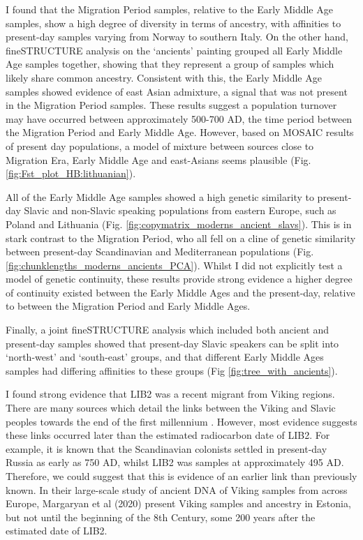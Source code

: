 I found that the Migration Period samples, relative to the Early Middle Age samples, show a high degree of diversity in terms of ancestry, with affinities to present-day samples varying from Norway to southern Italy. On the other hand, fineSTRUCTURE analysis on the `ancients' painting grouped all Early Middle Age samples together, showing that they represent a group of samples which likely share common ancestry. Consistent with this, the Early Middle Age samples showed evidence of east Asian admixture, a signal that was not present in the Migration Period samples. These results suggest a population turnover may have occurred between approximately 500-700 AD, the time period between the Migration Period and Early Middle Age. However, based on MOSAIC results of present day populations, a model of mixture between sources close to Migration Era, Early Middle Age and east-Asians seems plausible (Fig. \ref{fig:Fst_plot_HB:lithuanian}).


All of the Early Middle Age samples showed a high genetic similarity to present-day Slavic and non-Slavic speaking populations from eastern Europe, such as Poland and Lithuania (Fig. \ref{fig:copymatrix_moderns_ancient_slavs}). This is in stark contrast to the Migration Period, who all fell on a cline of genetic similarity between present-day Scandinavian and Mediterranean populations (Fig. \ref{fig:chunklengths_moderns_ancients_PCA}). Whilst I did not explicitly test a model of genetic continuity, these results provide strong evidence a higher degree of continuity existed between the Early Middle Ages and the present-day, relative to between the Migration Period and Early Middle Ages.

Finally, a joint fineSTRUCTURE analysis which included both ancient and present-day samples showed that present-day Slavic speakers can be split into  `north-west' and `south-east' groups, and that different Early Middle Ages samples had differing affinities to these groups (Fig \ref{fig:tree_with_ancients}). 

I found strong evidence that LIB2 was a recent migrant from Viking regions. There are many sources which detail the links between the Viking and Slavic peoples towards the end of the first millennium \cite{duczko2004viking, peterson2016vikings}. However, most evidence suggests these links occurred later than the estimated radiocarbon date of LIB2. For example, it is known that the Scandinavian colonists settled in present-day Russia as early as 750 AD, whilst LIB2 was samples at approximately 495 AD. Therefore, we could suggest that this is evidence of an earlier link than previously known. In their large-scale study of ancient DNA of Viking samples from across Europe, Margaryan et al (2020) present Viking samples and ancestry in Estonia, but not until the beginning of the 8th Century, some 200 years after the estimated date of LIB2.  

